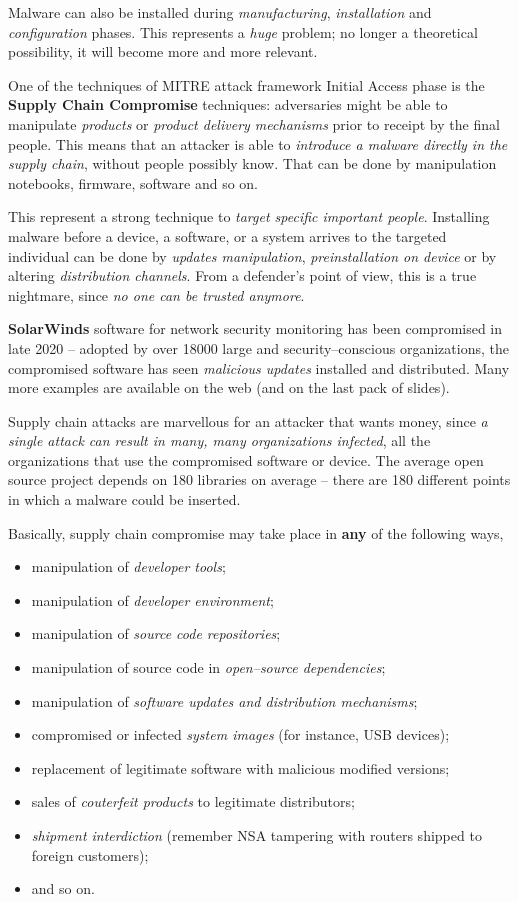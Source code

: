 \documentclass[10pt]{extbook}
\begin{document}
Malware can also be installed during \emph{manufacturing}, \emph{installation}
and \emph{configuration} phases. This represents a \emph{huge} problem; no
longer a theoretical possibility, it will become more and more relevant.

One of the techniques of MITRE attack framework Initial Access phase is the
\textbf{Supply Chain Compromise} techniques: adversaries might be able to
manipulate \emph{products} or \emph{product delivery mechanisms} prior to
receipt by the final people. This means that an attacker is able to
\emph{introduce a malware directly in the supply chain}, without people
possibly know. That can be done by manipulation notebooks, firmware, software
and so on.

This represent a strong technique to \emph{target specific important people}.
Installing malware before a device, a software, or a system arrives to the
targeted individual can be done by \emph{updates manipulation},
\emph{preinstallation on device} or by altering \emph{distribution channels}.
From a defender's point of view, this is a true nightmare, since \emph{no one
can be trusted anymore}.

\textbf{SolarWinds} software for network security monitoring has been
compromised in late 2020 -- adopted by over 18000 large and security--conscious
organizations, the compromised software has seen \emph{malicious updates}
installed and distributed. Many more examples are available on the web (and on
the last pack of slides).

Supply chain attacks are marvellous for an attacker that wants money, since
\emph{a single attack can result in many, many organizations infected}, all the
organizations that use the compromised software or device. The average open
source project depends on 180 libraries on average -- there are 180 different
points in which a malware could be inserted.

Basically, supply chain compromise may take place in \textbf{any} of the
following ways,
\begin{itemize}
    \item manipulation of \emph{developer tools};
    \item manipulation of \emph{developer environment};
    \item manipulation of \emph{source code repositories};
    \item manipulation of source code in \emph{open--source dependencies};
    \item manipulation of \emph{software updates and distribution mechanisms};
    \item compromised or infected \emph{system images} (for instance, USB
        devices);
    \item replacement of legitimate software with malicious modified versions;
    \item sales of \emph{couterfeit products} to legitimate distributors;
    \item \emph{shipment interdiction} (remember NSA tampering with routers
        shipped to foreign customers);
    \item and so on.
\end{itemize}
\end{document}
